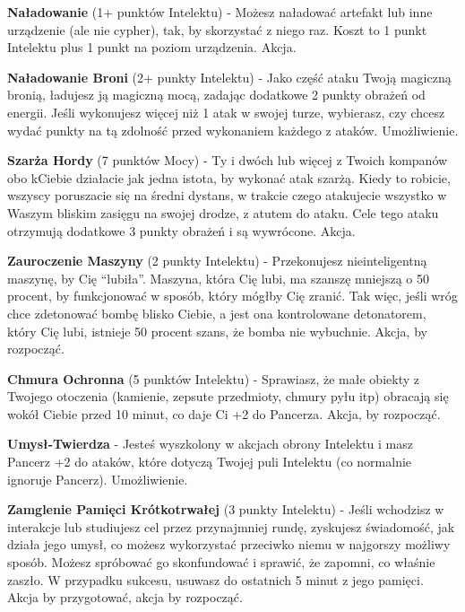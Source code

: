 {\textbf{Naładowanie}\label{sec:Naładowanie} (1+ punktów Intelektu) - Możesz naładować artefakt lub inne urządzenie (ale nie cypher), tak, by skorzystać z niego raz. Koszt to 1 punkt Intelektu plus 1 punkt na poziom urządzenia. Akcja.

\textbf{Naładowanie Broni}\label{sec:Naładowanie Broni} (2+ punkty Intelektu) - Jako część ataku Twoją magiczną bronią, ładujesz ją magiczną mocą, zadając dodatkowe 2 punkty obrażeń od energii. Jeśli wykonujesz więcej niż 1 atak w swojej turze, wybierasz, czy chcesz wydać punkty na tą zdolność przed wykonaniem każdego z ataków. Umożliwienie.

\textbf{Szarża Hordy}\label{sec:Szarża Hordy} (7 punktów Mocy) - Ty i dwóch lub więcej z Twoich kompanów obo kCiebie działacie jak jedna istota, by wykonać atak szarżą. Kiedy to robicie, wszyscy poruszacie się na średni dystans, w trakcie czego atakujecie wszystko w Waszym bliskim zasięgu na swojej drodze, z atutem do ataku. Cele tego ataku otrzymują dodatkowe 3 punkty obrażeń i są wywrócone. Akcja.

\textbf{Zauroczenie Maszyny}\label{sec:Zauroczenie Maszyny} (2 punkty Intelektu) - Przekonujesz nieinteligentną maszynę, by Cię ``lubiła''. Maszyna, która Cię lubi, ma szanszę mniejszą o 50 procent, by funkcjonować w sposób, który mógłby Cię zranić. Tak więc, jeśli wróg chce zdetonować bombę blisko Ciebie, a jest ona kontrolowane detonatorem, który Cię lubi, istnieje 50 procent szans, że bomba nie wybuchnie. Akcja, by rozpocząć. 

\textbf{Chmura Ochronna}\label{sec:Chmura Ochronna} (5 punktów Intelektu) - Sprawiasz, że małe obiekty z Twojego otoczenia (kamienie, zepsute przedmioty, chmury pyłu itp) obracają się wokół Ciebie przed 10 minut, co daje Ci +2 do Pancerza. Akcja, by rozpocząć. 

\textbf{Umysł-Twierdza}\label{sec:Umysł-Twierdza} - Jesteś wyszkolony w akcjach obrony Intelektu i masz Pancerz +2 do ataków, które dotyczą Twojej puli Intelektu (co normalnie ignoruje Pancerz). Umożliwienie. 

\textbf{Zamglenie Pamięci Krótkotrwałej}\label{sec:Zamglenie Pamięci Krótkotrwałej} (3 punkty Intelektu) - Jeśli wchodzisz w interakcje lub studiujesz cel przez przynajmniej rundę, zyskujesz świadomość, jak działa jego umysł, co możesz wykorzystać przeciwko niemu w najgorszy możliwy sposób. Możesz spróbować go skonfundować i sprawić, że zapomni, co właśnie zaszło. W przypadku sukcesu, usuwasz do ostatnich 5 minut z jego pamięci. Akcja by przygotować, akcja by rozpocząć.
 
}
